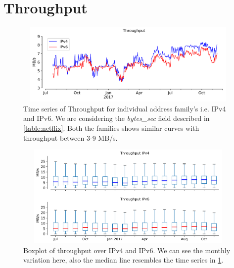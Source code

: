 \section{Throughput}
\begin{figure}[!ht]
	\centering
	\includegraphics[keepaspectratio, height=4cm, width=15cm]{figures/throughput/netflix-throughput-timeseries-separate.pdf}
	\caption[Throughput Timeseries for IPv4 and Ipv6]{Time series of Throughput for individual address family's i.e. IPv4 and IPv6. We are considering the \textit{bytes\_sec} field described in \cref{table:netflix}. Both the families shows similar curves with throughput between 3-9 MB/s.}
	\label{fig:Throughput Timeseries for IPv4 and Ipv6}
\end{figure}
\begin{figure}[!ht]
	\centering
	\includegraphics[keepaspectratio, height=5cm, width=15cm]{figures/throughput/netflix-throughput-boxplot-separate.pdf}
	\caption[Throughput Boxplot for IPv4 and IPv6]{Boxplot of throughput over IPv4 and IPv6. We can see the monthly variation here, also the median line resembles the time series in \cref{fig:Throughput Timeseries for IPv4 and Ipv6}.}
	\label{fig:Throughput Boxplot for IPv4 and IPv6}
\end{figure}

